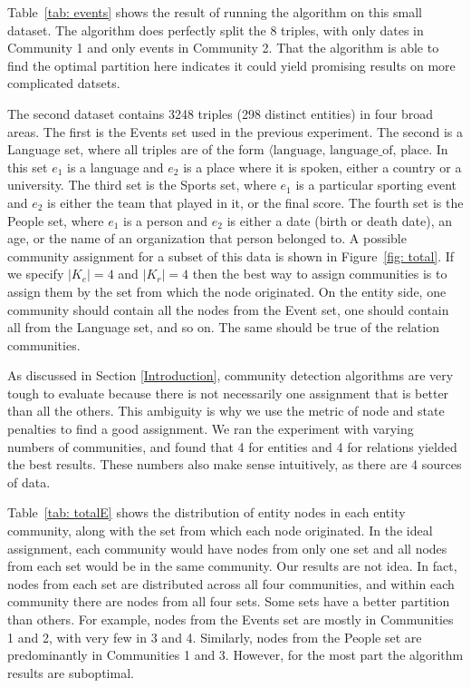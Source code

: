 \documentclass[12pt]{article}
\begin{document}
Table~\ref{tab: events} shows the result of running the algorithm on this small
dataset. The algorithm does perfectly split the 8 triples, with only dates in
Community 1 and only events in Community 2. That the algorithm is able to find
the optimal partition here indicates it could yield promising results on more
complicated datsets.

The second dataset contains 3248 triples (298 distinct entities) in four broad
areas. The first is the Events set used in the previous experiment. The second
is a Language set, where all triples are of the form $\langle \text{language},
\,\text{language\_of}, \,\text{place}$. In this set $e_1$ is a language and
$e_2$ is a place where it is spoken, either a country or a university. The third
set is the Sports set, where $e_1$ is a particular sporting event and $e_2$ is
either the team that played in it, or the final score. The fourth set is the
People set, where $e_1$ is a person and $e_2$ is either a date (birth or death
date), an age, or the name of an organization that person belonged to. A
possible community assignment for a subset of this data is shown in
Figure~\ref{fig: total}. If we specify $|K_e| = 4$ and $|K_r|=4$ then the best
way to assign communities is to assign them by the set from which the node
originated. On the entity side, one community should contain all the nodes from
the Event set, one should contain all from the Language set, and so on. The same
should be true of the relation communities.

As discussed in Section \ref{Introduction}, community detection algorithms are
very tough to evaluate because there is not necessarily one assignment that is
better than all the others. This ambiguity is why we use the metric of node and
state penalties to find a good assignment. We ran the experiment with varying
numbers of communities, and found that 4 for entities and 4 for relations
yielded the best results. These numbers also make sense intuitively, as there
are 4 sources of data.

Table~\ref{tab: totalE} shows the distribution of entity nodes in each entity
community, along with the set from which each node originated. In the ideal
assignment, each community would have nodes from only one set and all nodes
from each set would be in the same community. Our results are not idea. In fact,
nodes from each set are distributed across all four communities, and within each
community there are nodes from all four sets. Some sets have a better partition
than others. For example, nodes from the Events set are mostly in Communities
1 and 2, with very few in 3 and 4. Similarly, nodes from the People set are
predominantly in Communities 1 and 3. However, for the most part the algorithm
results are suboptimal.
\end{document}
